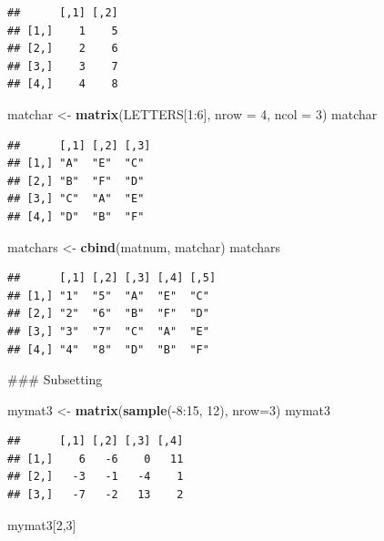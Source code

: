 \documentclass[]{book}
\newenvironment{Shaded}{\begin{snugshade}}{\end{snugshade}}
\newcommand{\KeywordTok}[1]{\textcolor[rgb]{0.13,0.29,0.53}{\textbf{{#1}}}}
\newcommand{\DataTypeTok}[1]{\textcolor[rgb]{0.13,0.29,0.53}{{#1}}}
\newcommand{\DecValTok}[1]{\textcolor[rgb]{0.00,0.00,0.81}{{#1}}}
\newcommand{\StringTok}[1]{\textcolor[rgb]{0.31,0.60,0.02}{{#1}}}
\newcommand{\NormalTok}[1]{{#1}}
\begin{document}
\begin{verbatim}
##      [,1] [,2]
## [1,]    1    5
## [2,]    2    6
## [3,]    3    7
## [4,]    4    8
\end{verbatim}

\begin{Shaded}
\begin{Highlighting}[]
\NormalTok{matchar <-}\StringTok{ }\KeywordTok{matrix}\NormalTok{(LETTERS[}\DecValTok{1}\NormalTok{:}\DecValTok{6}\NormalTok{], }\DataTypeTok{nrow =} \DecValTok{4}\NormalTok{, }\DataTypeTok{ncol =} \DecValTok{3}\NormalTok{)}
\NormalTok{matchar}
\end{Highlighting}
\end{Shaded}

\begin{verbatim}
##      [,1] [,2] [,3]
## [1,] "A"  "E"  "C" 
## [2,] "B"  "F"  "D" 
## [3,] "C"  "A"  "E" 
## [4,] "D"  "B"  "F"
\end{verbatim}

\begin{Shaded}
\begin{Highlighting}[]
\NormalTok{matchars <-}\StringTok{ }\KeywordTok{cbind}\NormalTok{(matnum, matchar)}
\NormalTok{matchars}
\end{Highlighting}
\end{Shaded}

\begin{verbatim}
##      [,1] [,2] [,3] [,4] [,5]
## [1,] "1"  "5"  "A"  "E"  "C" 
## [2,] "2"  "6"  "B"  "F"  "D" 
## [3,] "3"  "7"  "C"  "A"  "E" 
## [4,] "4"  "8"  "D"  "B"  "F"
\end{verbatim}

\begin{Shaded}
\begin{Highlighting}[]
\NormalTok{### Subsetting  }

\NormalTok{mymat3 <-}\StringTok{ }\KeywordTok{matrix}\NormalTok{(}\KeywordTok{sample}\NormalTok{(-}\DecValTok{8}\NormalTok{:}\DecValTok{15}\NormalTok{, }\DecValTok{12}\NormalTok{), }\DataTypeTok{nrow=}\DecValTok{3}\NormalTok{)}
\NormalTok{mymat3}
\end{Highlighting}
\end{Shaded}

\begin{verbatim}
##      [,1] [,2] [,3] [,4]
## [1,]    6   -6    0   11
## [2,]   -3   -1   -4    1
## [3,]   -7   -2   13    2
\end{verbatim}

\begin{Shaded}
\begin{Highlighting}[]
\NormalTok{mymat3[}\DecValTok{2}\NormalTok{,}\DecValTok{3}\NormalTok{]}
\end{Highlighting}
\end{Shaded}
\end{document}
